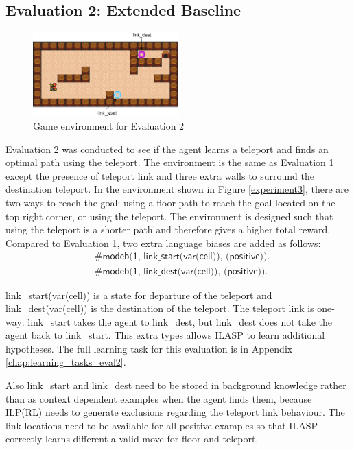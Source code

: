\subsection{Evaluation 2: Extended Baseline}
\label{subsec:experiement2_setup}

\begin{figure}[!htb]
\centering
\includegraphics[width=0.5\textwidth]{./figures/experiment2_setup}
\caption{Game environment for Evaluation 2}
\label{experiment2}
\end{figure}
Evaluation 2 was conducted to see if the agent learns a teleport and finds an optimal path using the teleport. The environment is the same as Evaluation 1 except the presence of teleport link and three extra walls to surround the destination teleport.
In the environment shown in Figure \ref{experiment3},
there are two ways to reach the goal: using a floor path to reach the goal located on the top right corner, or using the teleport.
The environment is designed such that using the teleport is a shorter path and therefore gives a higher total reward.
Compared to Evaluation 1, two extra language biases are added as follows:
\begin{equation*}
\begin{split}
&\textsf{\#modeb(1, link\_start(var(cell)), (positive)).}\\
&\textsf{\#modeb(1, link\_dest(var(cell)), (positive)).}
\end{split}
\end{equation*}

\textsf{link\_start(var(cell))} is a state for departure of the teleport and \textsf{link\_dest(var(cell))} is the destination of the teleport. 
The teleport link is one-way: \textsf{link\_start} takes the agent to \textsf{link\_dest}, but \textsf{link\_dest} does not take the agent back to \textsf{link\_start}.
This extra types allows ILASP to learn additional hypotheses.
The full learning task for this evaluation is in Appendix \ref{chap:learning_tasks_eval2}.

Also \textsf{link\_start} and \textsf{link\_dest} need to be stored in background knowledge rather than as context dependent examples when the agent finds them, 
because ILP(RL) needs to generate exclusions regarding the teleport link behaviour.
The link locations need to be available for all positive examples so that ILASP correctly learns different a valid move for floor and teleport.

